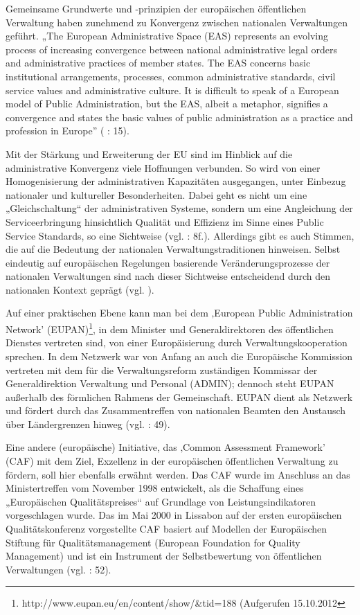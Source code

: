 Gemeinsame Grundwerte und -prinzipien der europäischen öffentlichen Verwaltung haben zunehmend zu Konvergenz zwischen nationalen Verwaltungen geführt. „The European Administrative Space (EAS) represents an evolving process of increasing convergence between national administrative legal orders and administrative practices of member states. The EAS concerns basic institutional arrangements, processes, common administrative standards, civil service values and administrative culture. It is difficult to speak of a European model of Public Administration, but the EAS, albeit a metaphor, signifies a convergence and states the basic values of public administration as a practice and profession in Europe” (\cite{oecd99} : 15). \par
Mit der Stärkung und Erweiterung der EU sind im Hinblick auf die administrative Konvergenz viele Hoffnungen verbunden. So wird von einer Homogenisierung der administrativen Kapazitäten ausgegangen, unter Einbezug nationaler und kultureller Besonderheiten. Dabei geht es nicht um eine „Gleichschaltung“ der administrativen Systeme, sondern um eine Angleichung der Serviceerbringung hinsichtlich Qualität und Effizienz im Sinne eines Public Service Standards, so eine Sichtweise (vgl. \cite{dorta} : 8f.). Allerdings gibt es auch Stimmen, die auf die Bedeutung der nationalen Verwaltungstraditionen hinweisen. Selbst eindeutig auf europäischen Regelungen basierende Veränderungsprozesse der nationalen Verwaltungen sind nach dieser Sichtweise entscheidend durch den nationalen Kontext geprägt (vgl. \cite{herit}).\par
Auf einer praktischen Ebene kann man bei dem ‚European Public Administration Network' (EUPAN)\footnote{http://www.eupan.eu/en/content/show/\&tid=188 (Aufgerufen 15.10.2012}, in dem Minister und Generaldirektoren des öffentlichen Dienstes vertreten sind, von einer Europäisierung durch Verwaltungskooperation sprechen. In dem Netzwerk war von Anfang an auch die Europäische Kommission vertreten mit dem für die Verwaltungsreform zuständigen Kommissar der Generaldirektion Verwaltung und Personal (ADMIN); dennoch steht EUPAN außerhalb des förmlichen Rahmens der Gemeinschaft. EUPAN dient als Netzwerk und fördert durch das Zusammentreffen von nationalen Beamten den Austausch über Ländergrenzen hinweg (vgl. \cite{mangenot} : 49).\par
Eine andere (europäische) Initiative, das ‚Common Assessment Framework’ (CAF) mit dem Ziel, Exzellenz in der europäischen öffentlichen Verwaltung zu fördern, soll hier ebenfalls erwähnt werden. Das CAF wurde im Anschluss an das Ministertreffen vom November 1998 entwickelt, als die Schaffung eines „Europäischen Qualitätspreises“ auf Grundlage von Leistungsindikatoren vorgeschlagen wurde. Das im Mai 2000 in Lissabon auf der ersten europäischen Qualitätskonferenz vorgestellte CAF basiert auf Modellen der Europäischen Stiftung für Qualitätsmanagement (European Foundation for Quality Management) und ist ein Instrument der Selbstbewertung von öffentlichen Verwaltungen (vgl. \cite{mangenot} : 52).\par
